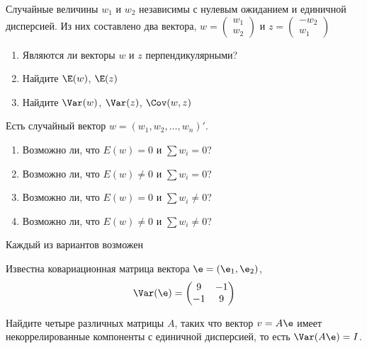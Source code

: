 \documentclass[pdftex,11pt,openany]{book}\usepackage[]{graphicx}\usepackage[]{color}
\begin{document}
\begin{solution}
\end{solution}

\begin{problem}
Случайные величины $w_1$ и $w_2$ независимы с нулевым ожиданием и единичной дисперсией. Из них составлено два вектора, 
$w=\left(
\begin{array}{c}
w_1 \\
w_2
\end{array}\right)$
и 
$z=\left(
\begin{array}{c}
-w_2 \\
w_1
\end{array}\right)$
\begin{enumerate}
\item Являются ли векторы $w$ и $z$ перпендикулярными?
\item Найдите $\E(w)$, $\E(z)$
\item Найдите $\Var(w)$, $\Var(z)$, $\Cov(w,z)$
\end{enumerate}
\end{problem}

\begin{solution}
\end{solution}


\begin{problem}
Есть случайный вектор $w=(w_1, w_2, \ldots, w_n)'$. 
\begin{enumerate}
\item Возможно ли, что $E(w)=0$ и $\sum w_i=0$?
\item Возможно ли, что $E(w)\neq 0$ и $\sum w_i=0$?
\item Возможно ли, что $E(w)=0$ и $\sum w_i \neq 0$?
\item Возможно ли, что $E(w)\neq 0$ и $\sum w_i \neq 0$?
\end{enumerate}
\end{problem}

\begin{solution}
Каждый из вариантов возможен
\end{solution}


\begin{problem}
Известна ковариационная матрица вектора $\e=(\e_1,\e_2)$,
\[
\Var(\e)=\left(
\begin{matrix}
9 & -1 \\
-1 & 9
\end{matrix}
\right)
\]

Найдите четыре различных матрицы $A$, таких что вектор $v=A\e$ имеет некоррелированные компоненты с единичной дисперсией, то есть $\Var(A\e)=I$.
\end{problem}
\end{document}
